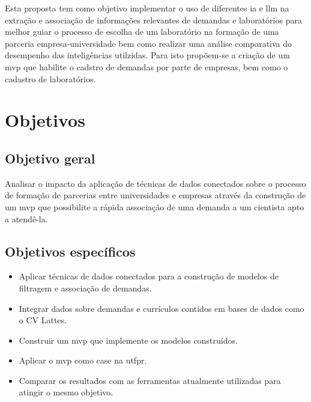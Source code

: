 Esta proposta tem como objetivo implementar o uso de diferentes \gls{ia} e \gls{llm} na extração e associação de informações relevantes de demandas e laboratórios para melhor guiar o processo de escolha de um laboratório na formação de uma parceria empresa-universidade bem como realizar uma análise comparativa do desempenho das inteligências utilzidas. Para isto propõem-se a criação de um \gls{mvp} que habilite o cadstro de demandas por parte de empresas, bem como o cadastro de laboratórios.

\section{Objetivos}\label{sec:objetivos}

\subsection{Objetivo geral}\label{subsec:objetivoGeral}

Analisar o impacto da aplicação de técnicas de dados conectados sobre o processo de formação de parcerias entre universidades e empresas através da construção de um \gls{mvp} que possibilite a rápida associação de uma demanda a um cientista apto a atendê-la.

\subsection{Objetivos específicos}\label{subsec:objetivosEspecificos}

\begin{itemize}
    \item Aplicar técnicas de dados conectados para a construção de modelos de filtragem e associação de demandas.
    \item Integrar dados sobre demandas e currículos contidos em bases de dados como o CV Lattes.
    \item Construir um \gls{mvp} que implemente os modelos construídos.
    \item Aplicar o \gls{mvp} como case na \gls{utfpr}.
    \item Comparar os resultados com as ferramentas atualmente utilizadas para atingir o mesmo objetivo.
\end{itemize}

